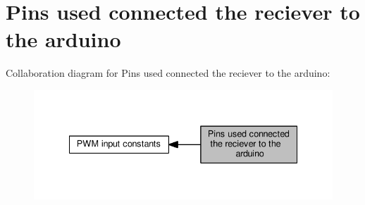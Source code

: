 \hypertarget{group__RecieverPwmPins}{}\section{Pins used connected the reciever to the arduino}
\label{group__RecieverPwmPins}
Collaboration diagram for Pins used connected the reciever to the arduino\+:\nopagebreak
\begin{figure}[H]
\begin{center}
\leavevmode
\includegraphics[width=335pt]{group__RecieverPwmPins}
\end{center}
\end{figure}
